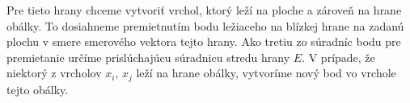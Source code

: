 \begin{itemize}
{    Pre tieto hrany chceme vytvoriť vrchol, ktorý leží na ploche a zároveň na hrane obálky.
    To dosiahneme premietnutím bodu ležiaceho na blízkej hrane na zadanú plochu v smere 
    smerového vektora tejto hrany. Ako tretiu zo súradníc bodu pre premietanie určíme 
    prislúchajúcu súradnicu stredu hrany $E$. V prípade, že niektorý z vrcholov 
    $x_i$, $x_j$ leží na hrane obálky, vytvoríme nový bod vo vrchole tejto obálky. 

}
\end{itemize}

